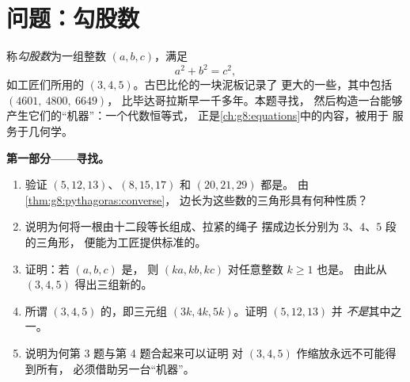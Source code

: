 \section{问题：勾股数}

\begin{problem}[{周末问题——整数直角三角形，
以及恒等式 $(m^2 - n^2)^2 + (2mn)^2 = (m^2 + n^2)^2$，
它能生成全部此类三角形}]
\label{pb:g8:pythagoras:1}
称\emph{勾股数}为一组整数
$(a, b, c)$，满足
\[
a^2 + b^2 = c^2 ,
\]
如工匠们所用的 $(3, 4, 5)$。古巴比伦的一块泥板记录了
更大的一些，其中包括 $(4601,\ 4800,\ 6649)$，
比毕达哥拉斯早一千多年。本题寻找，
然后构造一台能够产生它们的“机器”：一个代数恒等式，
正是\cref{ch:g8:equations}中的内容，被用于
服务于几何学。

\medskip
\noindent\textbf{第一部分——寻找。}
\begin{enumerate}
  \item 验证 $(5, 12, 13)$、$(8, 15, 17)$ 和
        $(20, 21, 29)$ 都是。
        由\cref{thm:g8:pythagoras:converse}，
        边长为这些数的三角形具有何种性质？
  \item 说明为何将一根由十二段等长组成、拉紧的绳子
        摆成边长分别为 $3$、$4$、$5$ 段的三角形，
        便能为工匠提供标准的。
  \item 证明：若 $(a, b, c)$ 是，
        则 $(ka, kb, kc)$ 对任意整数 $k \geq 1$ 也是。
        由此从 $(3, 4, 5)$ 得出三组新的。
  \item 所谓 $(3, 4, 5)$ 的，即三元组
        $(3k, 4k, 5k)$。证明 $(5, 12, 13)$ 并
        \emph{不是}其中之一。
  \item 说明为何第 3 题与第 4 题合起来可以证明
        对 $(3, 4, 5)$ 作缩放永远不可能得到所有，
        必须借助另一台“机器”。
\end{enumerate}


\end{problem}

